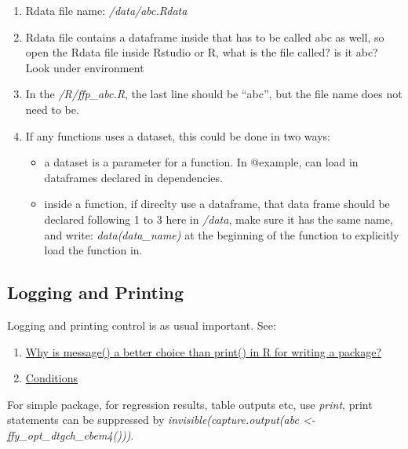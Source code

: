 \documentclass[
]{article}
\providecommand{\tightlist}{%
  \setlength{\itemsep}{0pt}\setlength{\parskip}{0pt}}
\begin{document}
\begin{enumerate}
\def\labelenumi{\arabic{enumi}.}
\tightlist
\item
  Rdata file name: \emph{/data/abc.Rdata}
\item
  Rdata file contains a dataframe inside that has to be called abc as
  well, so open the Rdata file inside Rstudio or R, what is the file
  called? is it abc? Look under environment
\item
  In the \emph{/R/ffp\_abc.R}, the last line should be ``abc'', but the
  file name does not need to be.
\item
  If any functions uses a dataset, this could be done in two ways:

  \begin{itemize}
  \tightlist
  \item
    a dataset is a parameter for a function. In @example, can load in
    dataframes declared in dependencies.
  \item
    inside a function, if direclty use a dataframe, that data frame
    should be declared following 1 to 3 here in \emph{/data}, make sure
    it has the same name, and write: \emph{data(data\_name)} at the
    beginning of the function to explicitly load the function in.
  \end{itemize}
\end{enumerate}

\hypertarget{logging-and-printing}{%
\subsection{Logging and Printing}\label{logging-and-printing}}

Logging and printing control is as usual important. See:

\begin{enumerate}
\def\labelenumi{\arabic{enumi}.}
\tightlist
\item
  \href{https://stackoverflow.com/questions/36699272/why-is-message-a-better-choice-than-print-in-r-for-writing-a-package/36700294\#36700294}{Why
  is message() a better choice than print() in R for writing a package?}
\item
  \href{https://adv-r.hadley.nz/conditions.html}{Conditions}
\end{enumerate}

For simple package, for regression results, table outputs etc, use
\emph{print}, print statements can be suppressed by
\emph{invisible(capture.output(abc \textless-
ffy\_opt\_dtgch\_cbem4()))}.
\end{document}
